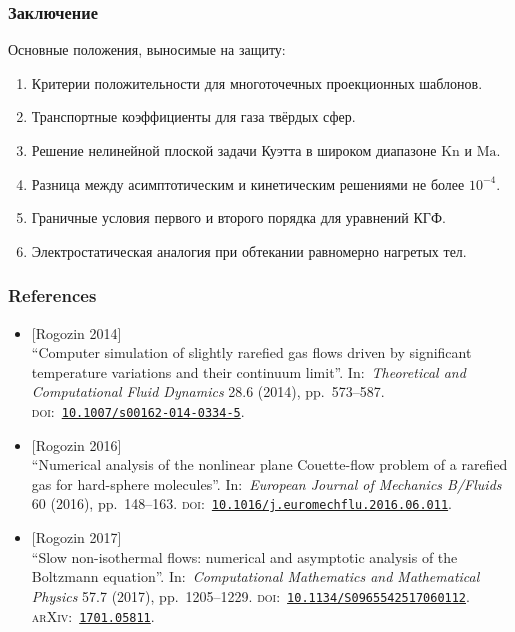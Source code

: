 \documentclass[mathserif]{beamer} %
\newcommand{\Kn}{\mathrm{Kn}}
\newcommand{\Ma}{\mathrm{Ma}}
\begin{document}
\begin{frame}
    \frametitle{Заключение}
    Основные положения, выносимые на защиту:
    \begin{enumerate}
        \item\label{defpos:stencils}
        Критерии положительности для многоточечных проекционных шаблонов.
        \item\label{defpos:transport_coeffs}
        Транспортные коэффициенты для газа твёрдых сфер.
        \item\label{defpos:Couette_flow}
        Решение нелинейной плоской задачи Куэтта в широком диапазоне \(\Kn\) и \(\Ma\).
        \item\label{defpos:asymptotic_verification}
        Разница между асимптотическим и кинетическим решениями не более \(10^{-4}\).
        \item\label{defpos:boundary_conditions}
        Граничные условия первого и второго порядка для уравнений КГФ.
        \item\label{defpos:snit_forces}
        Электростатическая аналогия при обтекании равномерно нагретых тел.
    \end{enumerate}
\end{frame}

\begin{frame}
    \frametitle{References}
    \newcommand\zerodoi{10.1007/s00162-014-0334-5}
    \newcommand\firstdoi{10.1016/j.euromechflu.2016.06.011}
    \newcommand\seconddoi{10.1134/S0965542517060112}
    \newcommand\secondarxiv{1701.05811}
    \begin{itemize}
        \item {[Rogozin 2014]} \\
        “Computer simulation of slightly rarefied gas flows driven by significant temperature variations and their continuum limit”.
        In:~\textit{Theoretical and Computational Fluid Dynamics} 28.6 (2014), pp.~573–587.
        \textsc{doi}:~\href{http://dx.doi.org/\zerodoi}{\alert{\texttt{\zerodoi}}}.
        \item {[Rogozin 2016]} \\
        “Numerical analysis of the nonlinear plane Couette-flow problem of a rarefied gas for hard-sphere molecules”.
        In:~\textit{European Journal of Mechanics B/Fluids} 60 (2016), pp.~148–163.
        \textsc{doi}:~\href{http://dx.doi.org/\firstdoi}{\alert{\texttt{\firstdoi}}}.
        \item {[Rogozin 2017]} \\
        “Slow non-isothermal flows: numerical and asymptotic analysis of the Boltzmann equation”.
        In:~\textit{Computational Mathematics and Mathematical Physics} 57.7 (2017), pp.~1205–1229.
        \textsc{doi}:~\href{http://dx.doi.org/\seconddoi}{\alert{\texttt{\seconddoi}}}.
        \textsc{arXiv}:~\href{http://arxiv.org/abs/\secondarxiv}{\alert{\texttt{\secondarxiv}}}.
    \end{itemize}
\end{frame}
\end{document}
